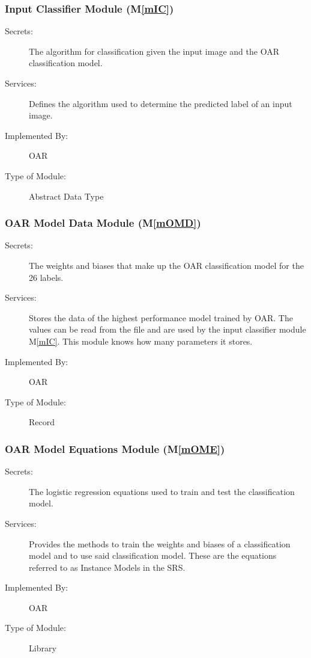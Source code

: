 \documentclass[12pt, titlepage]{article}
\newcommand{\mref}[1]{M\ref{#1}}
\begin{document}
\subsubsection{Input Classifier Module (\mref{mIC})}

\begin{description}
\item[Secrets:] The algorithm for classification given the input image and the OAR classification model.
\item[Services:] Defines the algorithm used to determine the predicted label of an input image.
\item[Implemented By:] OAR
\item[Type of Module:] Abstract Data Type
\end{description}

\subsubsection{OAR Model Data Module (\mref{mOMD})}

\begin{description}
\item[Secrets:] The weights and biases that make up the OAR classification model for the 26 labels.
\item[Services:] Stores the data of the highest performance model trained by OAR. The values can be read from the file and are used by 
the input classifier module \mref{mIC}. This module knows how many parameters it stores.
\item[Implemented By:] OAR
\item[Type of Module:] Record
\end{description}

\subsubsection{OAR Model Equations Module (\mref{mOME})}

\begin{description}
\item[Secrets:] The logistic regression equations used to train and test the classification model.
\item[Services:] Provides the methods to train the weights and biases of a classification model and to use
said classification model. These are the equations referred to as Instance Models in the SRS.
\item[Implemented By:] OAR
\item[Type of Module:] Library
\end{description}
\end{document}

